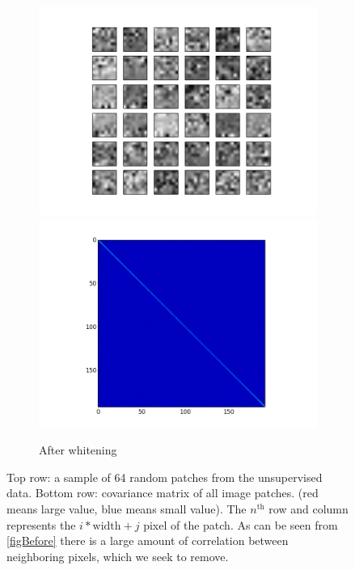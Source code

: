 \documentclass{article} %
\begin{document}
\begin{figure}
\begin{subfigure}[h]{0.45\columnwidth}
    \includegraphics[width=\columnwidth]{./images/patches_after_whiten.png}
    \includegraphics[width=\columnwidth]{./images/after_whiten.png}
    \caption{After whitening}
    \label{figAfter}
  \end{subfigure}
  \caption{Top row: a sample of 64 random patches from the unsupervised data. Bottom row: covariance matrix of all image patches. (red means large value, blue means small value). The $n^{\text{th}}$ row and column represents the $i*\text{width} + j$ pixel of the patch. As can be seen from \ref{figBefore} there is a large amount of correlation between neighboring pixels, which we seek to remove.}
  \label{whitening}
\end{figure}
\end{document}
